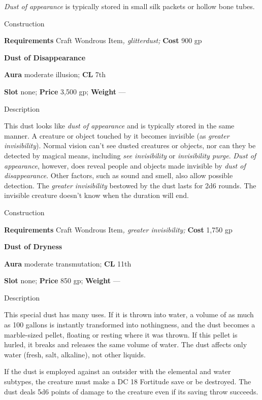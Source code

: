 \textit{Dust of appearance} is typically stored in small silk packets or hollow bone tubes. 
				
Construction
				
\textbf{Requirements} Craft Wondrous Item\textit{, glitterdust; }\textbf{Cost }900 gp
				
\textbf{Dust of Disappearance}
				
\textbf{Aura} moderate illusion;\textbf{ CL }7th
				
\textbf{Slot} none; \textbf{Price} 3,500 gp; \textbf{Weight }---
				
Description
				
This dust looks like \textit{dust of appearance} and is typically stored in the same manner. A creature or object touched by it becomes invisible (as \textit{greater invisibility}). Normal vision can't see dusted creatures or objects, nor can they be detected by magical means, including \textit{see invisibility} or \textit{invisibility purge}. \textit{Dust of appearance}, however, does reveal people and objects made invisible by \textit{dust of disappearance}. Other factors, such as sound and smell, also allow possible detection. The \textit{greater invisibility} bestowed by the dust lasts for 2d6 rounds. The invisible creature doesn't know when the duration will end. 
				
Construction
				
\textbf{Requirements} Craft Wondrous Item\textit{, greater invisibility;}\textbf{ Cost }1,750 gp
				
\textbf{Dust of Dryness}
				
\textbf{Aura} moderate transmutation;\textbf{ CL }11th
				
\textbf{Slot} none; \textbf{Price} 850 gp; \textbf{Weight }---
				
Description
				
This special dust has many uses. If it is thrown into water, a volume of as much as 100 gallons is instantly transformed into nothingness, and the dust becomes a marble-sized pellet, floating or resting where it was thrown. If this pellet is hurled, it breaks and releases the same volume of water. The dust affects only water (fresh, salt, alkaline), not other liquids.
				
If the dust is employed against an outsider with the elemental and water subtypes, the creature must make a DC 18 Fortitude save or be destroyed. The dust deals 5d6 points of damage to the creature even if its saving throw succeeds. 
				
